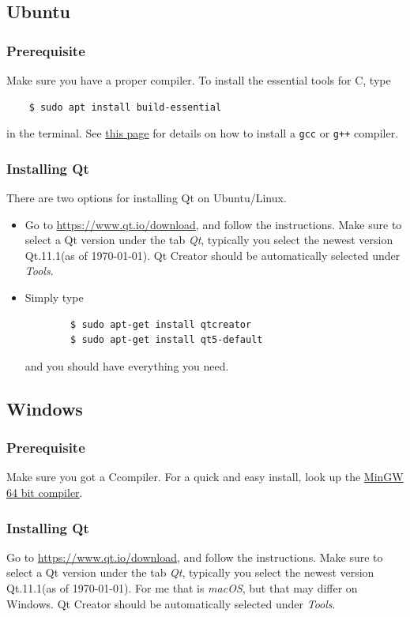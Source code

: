 \documentclass[11pt]{article}
\newcommand{\CC}{C\nolinebreak\hspace{-.05em}\raisebox{.4ex}{\tiny\bf +}\nolinebreak\hspace{-.10em}\raisebox{.4ex}{\tiny\bf +}}
\def\CC{{C\nolinebreak[4]\hspace{-.05em}\raisebox{.4ex}{\tiny\bf ++}}}
\begin{document}
\subsection{Ubuntu}
\subsubsection{Prerequisite}
Make sure you have a proper compiler. To install the essential tools for \CC, type
\begin{lstlisting}
    $ sudo apt install build-essential
\end{lstlisting}
in the terminal. See \href{https://linuxconfig.org/how-to-install-gcc-the-c-compiler-on-ubuntu-18-04-bionic-beaver-linux}{this page} for details on how to install a \texttt{gcc} or \texttt{g++} compiler.
\subsubsection{Installing Qt}
There are two options for installing Qt on Ubuntu/Linux.
\begin{itemize}
    \item Go to \url{https://www.qt.io/download}, and follow the instructions. Make sure to select a Qt version under the tab \emph{Qt}, typically you select the newest version Qt.11.1(as of \today). Qt Creator should be automatically selected under \emph{Tools}.
    \item Simply type
    \begin{lstlisting}
        $ sudo apt-get install qtcreator
        $ sudo apt-get install qt5-default
    \end{lstlisting}
    and you should have everything you need.
\end{itemize}

\subsection{Windows}
\subsubsection{Prerequisite}
Make sure you got a \CC compiler. For a quick and easy install, look up the \href{https://sourceforge.net/projects/mingw-w64/}{MinGW 64 bit compiler}.
\subsubsection{Installing Qt}
Go to \url{https://www.qt.io/download}, and follow the instructions. Make sure to select a Qt version under the tab \emph{Qt}, typically you select the newest version Qt.11.1(as of \today). For me that is \emph{macOS}, but that may differ on Windows. Qt Creator should be automatically selected under \emph{Tools}.
\end{document}
